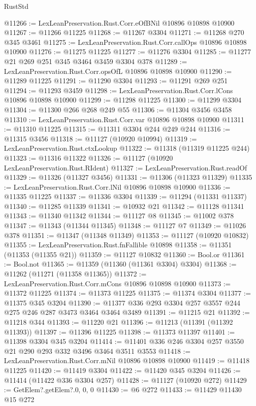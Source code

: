 \begin{lexlean}{RustStd}
\begin{coremodule}
{{{{{{{{{{{{{{{{{{{@11266 := LexLeanPreservation.Rust.Corr.eOfBNil @10896 @10898 @10900
@11267 := @11266 @11225
@11268 := @11267 @3304
@11271 := @11268 @270 @345 @3461
@11275 := LexLeanPreservation.Rust.Corr.callOps @10896 @10898 @10900
@11276 := @11275 @11225
@11277 := @11276 @3304
@11285 := @11277 @21 @269 @251 @345 @3464 @3459 @3304 @378
@11289 := LexLeanPreservation.Rust.Corr.opsOfL @10896 @10898 @10900
@11290 := @11289 @11225
@11291 := @11290 @3304
@11293 := @11291 @269 @251
@11294 := @11293 @3459
@11298 := LexLeanPreservation.Rust.Corr.lCons @10896 @10898 @10900
@11299 := @11298 @11225
@11300 := @11299 @3304
@11304 := @11300 @266 @268 @249 @55
@11306 := @11304 @3456 @3458
@11310 := LexLeanPreservation.Rust.Corr.var @10896 @10898 @10900
@11311 := @11310 @11225
@11315 := @11311 @3304 @244 @249 @244
@11316 := @11315 @3456
@11318 := @11127 (@10920 @10994)
@11319 := LexLeanPreservation.Rust.ctxLookup
@11322 := @11318 (@11319 @11225 @244)
@11323 := @11316 @11322
@11326 := @11127 (@10920 LexLeanPreservation.Rust.RIdent)
@11327 := LexLeanPreservation.Rust.readOf
@11329 := @11326 (@11327 @3456)
@11331 := @11306 (@11323 @11329)
@11335 := LexLeanPreservation.Rust.Corr.lNil @10896 @10898 @10900
@11336 := @11335 @11225
@11337 := @11336 @3304
@11339 := @11294 (@11331 @11337)
@11340 := @11285 @11339
@11341 := @10932 @21
@11342 := @11128 @11341
@11343 := @11340 @11342
@11344 := @11127 @8
@11345 := @11002 @378
@11347 := @11343 (@11344 @11345)
@11348 := @11127 @7
@11349 := @11026 @378
@11351 := @11347 (@11348 @11349)
@11353 := @11127 (@10920 @10832)
@11355 := LexLeanPreservation.Rust.fnFallible @10898
@11358 := @11351 (@11353 (@11355 @21))
@11359 := @11127 @10832
@11360 := Bool.or
@11361 := Bool.not
@11365 := @11359 (@11360 (@11361 @3304) @3304)
@11368 := @11262 (@11271 (@11358 @11365))
@11372 := LexLeanPreservation.Rust.Corr.mCons @10896 @10898 @10900
@11373 := @11372 @11225
@11374 := @11373 @11225
@11375 := @11374 @3304
@11377 := @11375 @345 @3204
@11390 := @11377 @336 @293 @3304 @257 @3557 @244 @275 @246 @287 @3473 @3464 @3464 @3489
@11391 := @11215 @21
@11392 := @11218 @344
@11393 := @11220 @21
@11396 := @11213 (@11391 (@11392 @11393))
@11397 := @11396 @11225
@11398 := @11373 @11397
@11401 := @11398 @3304 @345 @3204
@11414 := @11401 @336 @246 @3304 @257 @3550 @21 @290 @293 @332 @3496 @3464 @3511 @3553
@11418 := LexLeanPreservation.Rust.Corr.mNil @10896 @10898 @10900
@11419 := @11418 @11225
@11420 := @11419 @3304
@11422 := @11420 @345 @3204
@11426 := @11414 (@11422 @336 @3304 @257)
@11428 := @11127 (@10920 @272)
@11429 := GetElem?.getElem?.{0, 0, 0}
@11430 := @6 @272
@11433 := @11429 @11430 @15 @272
}}}}}}}}}}}}}}}}}}}
\end{coremodule}
\end{lexlean}
